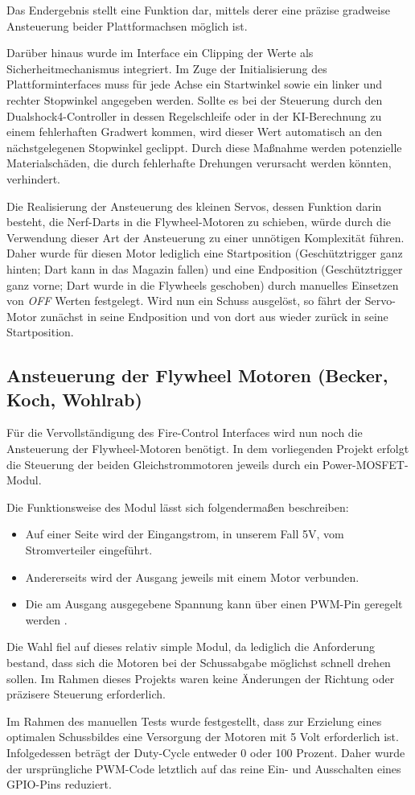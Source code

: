 Das Endergebnis stellt eine Funktion dar, mittels derer eine präzise gradweise Ansteuerung beider Plattformachsen möglich ist.

Darüber hinaus wurde im Interface ein Clipping der Werte als Sicherheitmechanismus integriert. Im Zuge der Initialisierung des Plattforminterfaces muss für jede Achse ein Startwinkel sowie ein linker und rechter Stopwinkel angegeben werden.
Sollte es bei der Steuerung durch den Dualshock4-Controller in dessen Regelschleife oder in der KI-Berechnung zu einem fehlerhaften Gradwert kommen, wird dieser Wert automatisch an den nächstgelegenen Stopwinkel geclippt. 
Durch diese Maßnahme werden potenzielle Materialschäden, die durch fehlerhafte Drehungen verursacht werden könnten, verhindert.

Die Realisierung der Ansteuerung des kleinen Servos, dessen Funktion darin besteht, die Nerf-Darts in die Flywheel-Motoren zu schieben, würde durch die Verwendung dieser Art der Ansteuerung zu einer unnötigen Komplexität führen.
Daher wurde für diesen Motor lediglich eine Startposition (Geschütztrigger ganz hinten; Dart kann in das Magazin fallen) und eine Endposition (Geschütztrigger ganz vorne; Dart wurde in die Flywheels geschoben) durch manuelles Einsetzen von \textit{OFF} Werten festgelegt.
Wird nun ein Schuss ausgelöst, so fährt der Servo-Motor zunächst in seine Endposition und von dort aus wieder zurück in seine Startposition.

\subsection{Ansteuerung der Flywheel Motoren (Becker, Koch, Wohlrab)}

Für die Vervollständigung des Fire-Control Interfaces wird nun noch die Ansteuerung der Flywheel-Motoren benötigt.
In dem vorliegenden Projekt erfolgt die Steuerung der beiden Gleichstrommotoren jeweils durch ein Power-MOSFET-Modul.

Die Funktionsweise des Modul lässt sich folgendermaßen beschreiben:

\begin{itemize}
    \item Auf einer Seite wird der Eingangstrom, in unserem Fall 5V, vom Stromverteiler eingeführt.
    \item Andererseits wird der Ausgang jeweils mit einem Motor verbunden.
    \item Die am Ausgang ausgegebene Spannung kann über einen PWM-Pin geregelt werden \cite{esp_platform_flywheel_motor}.
\end{itemize}

Die Wahl fiel auf dieses relativ simple Modul, da lediglich die Anforderung bestand, dass sich die Motoren bei der Schussabgabe möglichst schnell drehen sollen.
Im Rahmen dieses Projekts waren keine Änderungen der Richtung oder präzisere Steuerung erforderlich.

Im Rahmen des manuellen Tests wurde festgestellt, dass zur Erzielung eines optimalen Schussbildes eine Versorgung der Motoren mit 5 Volt erforderlich ist. 
Infolgedessen beträgt der Duty-Cycle entweder 0 oder 100 Prozent.
Daher wurde der ursprüngliche PWM-Code letztlich auf das reine Ein- und Ausschalten eines GPIO-Pins reduziert.